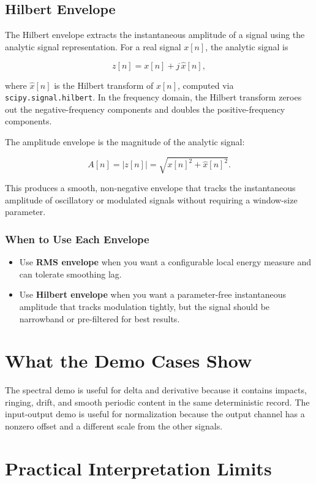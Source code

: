 \documentclass[11pt,a4paper]{article}
\begin{document}
\subsection{Hilbert Envelope}

The Hilbert envelope extracts the instantaneous amplitude of a signal using the analytic signal representation. For a real signal $x[n]$, the analytic signal is

\[
z[n] = x[n] + j\,\hat{x}[n],
\]

where $\hat{x}[n]$ is the Hilbert transform of $x[n]$, computed via \texttt{scipy.signal.hilbert}. In the frequency domain, the Hilbert transform zeroes out the negative-frequency components and doubles the positive-frequency components.

The amplitude envelope is the magnitude of the analytic signal:

\[
A[n] = |z[n]| = \sqrt{x[n]^2 + \hat{x}[n]^2}.
\]

This produces a smooth, non-negative envelope that tracks the instantaneous amplitude of oscillatory or modulated signals without requiring a window-size parameter.

\subsubsection{When to Use Each Envelope}

\begin{itemize}
    \item Use \textbf{RMS envelope} when you want a configurable local energy measure and can tolerate smoothing lag.
    \item Use \textbf{Hilbert envelope} when you want a parameter-free instantaneous amplitude that tracks modulation tightly, but the signal should be narrowband or pre-filtered for best results.
\end{itemize}

\section{What the Demo Cases Show}

The spectral demo is useful for delta and derivative because it contains impacts, ringing, drift, and smooth periodic content in the same deterministic record. The input-output demo is useful for normalization because the output channel has a nonzero offset and a different scale from the other signals.

\section{Practical Interpretation Limits}
\end{document}

